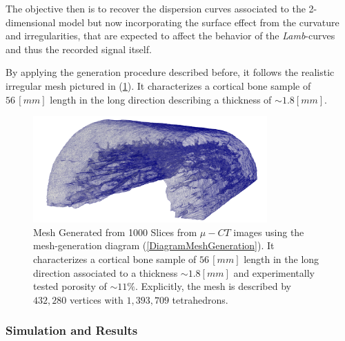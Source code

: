 The objective then is to recover the dispersion curves associated to the 2-dimensional model but now incorporating the surface effect from the curvature and irregularities, that are expected to affect the behavior of the \textit{Lamb}-curves and thus the recorded signal itself.

By applying the generation procedure described before, it follows the realistic irregular mesh pictured in (\ref{HomBoneMeshFile}). It characterizes a cortical bone sample of $56 \, [mm]$ length in the long direction describing a thickness of $\sim 1.8 [mm]$. 

\begin{figure}[!h]
	\centering
	\includegraphics[width=0.8\textwidth]{images/ImgExt/CorticalBoneS1000OPT20-View.png}
	\caption{Mesh Generated from 1000 Slices from $\mu-CT$ images using the mesh-generation diagram (\ref{DiagramMeshGeneration}). It characterizes a cortical bone sample of $56 \, [mm]$ length in the long direction associated to a thickness $\sim 1.8 [mm]$ and experimentally tested porosity of $\sim 11 \%$. Explicitly, the mesh is described by $432,280$ vertices with $1,393,709$ tetrahedrons.}
	\label{HomBoneMeshFile}
\end{figure} 

 \subsubsection{Simulation and Results}

